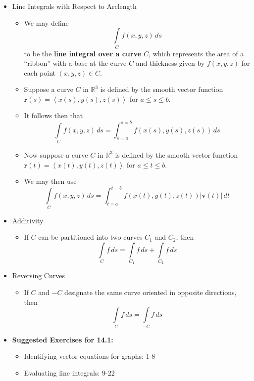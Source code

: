 \documentclass[12pt]{article}
\theoremstyle{plain}
\theoremstyle{definition}
\theoremstyle{remark}
\newcommand{\vect}[1]{\mathbf{#1}}
\newcommand{\dvar}[1]{\,d{#1}}
\begin{document}
	\begin{itemize}
	
	\item Line Integrals with Respect to Arclength
	
		\begin{itemize}
		\item We may define \[\int\limits_C f(x,y,z)\dvar{s}\] to be the \textbf{line integral over a curve $C$}, which represents the area of a ``ribbon'' with a base at the curve $C$ and thickness given by $f(x,y,z)$ for each point $(x,y,z)\in C$.
		\item Suppose a curve $C$ in $\mathbb{R}^3$ is defined by the smooth vector function $\vect{r}(s)=\left<x(s),y(s),z(s)\right>$ for $a\leq s\leq b$.
		\item It follows then that \[\int\limits_C f(x,y,z)\dvar{s} = \int_{s=a}^{s=b} f(x(s),y(s),z(s))\dvar{s}\]
		\item Now suppose a curve $C$ in $\mathbb{R}^3$ is defined by the smooth vector function $\vect{r}(t)=\left<x(t),y(t),z(t)\right>$ for $a\leq t\leq b$.
		\item We may then use \[\int\limits_C f(x,y,z)\dvar{s}=\int_{t=a}^{t=b} f(x(t),y(t),z(t))|\vect{v}(t)|\dvar{t}\]
		\end{itemize}
		
	\item Additivity
	
		\begin{itemize}
		\item If $C$ can be partitioned into two curves $C_1$ and $C_2$, then \[\int\limits_C f\dvar{s}=\int\limits_{C_1}f\dvar{s}+\int\limits_{C_2}f\dvar{s}\]
		\end{itemize}
		
	\newpage
	
	\item Reversing Curves
	
		\begin{itemize}
		\item If $C$ and $-C$ designate the same curve oriented in opposite directions, then \[\int\limits_{C} f\dvar{s} = \int\limits_{-C} f\dvar{s}\]
		\end{itemize}
				
	\item \textbf{Suggested Exercises for 14.1:}
	
		\begin{itemize}
		\item Identifying vector equations for graphs: 1-8
		\item Evaluating line integrals: 9-22
		\end{itemize}
		
	\end{itemize}
	
\end{document}
